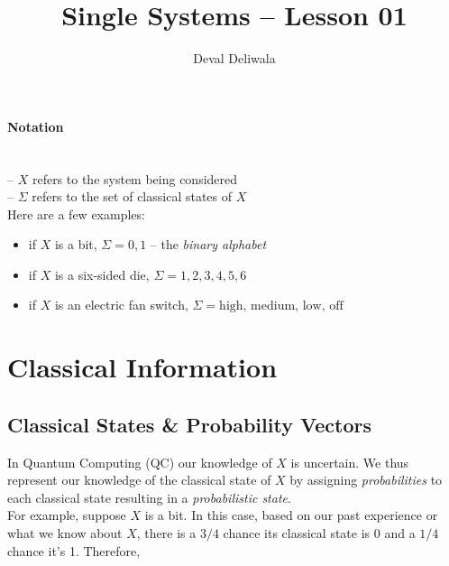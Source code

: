 \documentclass[svgnames]{article}     %
\title{Single Systems -- Lesson 01}
\author{Deval Deliwala}
\begin{document}
\maketitle
\tableofcontents                     %
\newpage

\paragraph{Notation} \mbox{} \\

 -- $X$ refers to the system being considered \\
 -- $\Sigma$ refers to the set of classical states of $X$ \\

Here are a few examples: 

\begin{itemize}
  \item[-] if $X$ is a bit, $\Sigma = {0, 1}$ -- the \textit{binary alphabet}
  \item[-] if $X$ is a six-sided die, $\Sigma = {1,2,3,4,5,6}$ 
  \item[-] if $X$ is an electric fan switch, $\Sigma = {\text{high, medium, low, off}} $
\end{itemize} 

\section{Classical Information}

\subsection{Classical States \& Probability Vectors}

In Quantum Computing (QC) our knowledge of $X$ is uncertain. We thus represent our knowledge of the classical state of $X$ by assigning \textit{probabilities} to each classical state resulting in a  \textit{probabilistic state}. \\

For example, suppose $X$ is a bit. In this case, based on our past experience or what we know about $X$, there is a $3/4$ chance its classical state is 0 and a $1/4$ chance it's 1. Therefore,
\end{document}
